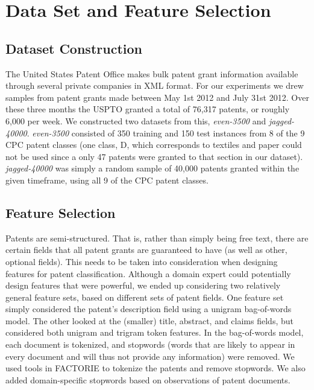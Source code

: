 \section{Data Set and Feature Selection}

\subsection{Dataset Construction}
The United States Patent Office makes bulk patent grant information available through several private companies\cite{USPTO:2013:patent-catalog} in XML format\cite{USPTO:2013:dtd}. For our experiments we drew samples from patent grants made between May 1st 2012 and July 31st 2012. Over these three months the USPTO granted a total of 76,317 patents, or roughly 6,000 per week. We constructed two datasets from this, \emph{even-3500} and \emph{jagged-40000}. \emph{even-3500} consisted of 350 training and 150 test instances from 8 of the 9 CPC patent classes (one class, D, which corresponds to textiles and paper could not be used since a only 47 patents were granted to that section in our dataset). \emph{jagged-40000} was simply a random sample of 40,000 patents granted within the given timeframe, using all 9 of the CPC patent classes.

\subsection{Feature Selection}
Patents are semi-structured. That is, rather than simply being free text, there are certain fields that all patent grants are guaranteed to have (as well as other, optional fields). This needs to be taken into consideration when designing features for patent classification. Although a domain expert could potentially design features that were powerful, we ended up considering two relatively general feature sets, based on different sets of patent fields. One feature set simply considered the patent's description field using a unigram bag-of-words model. The other looked at the (smaller) title, abstract, and claims fields, but considered both unigram and trigram token features. In the bag-of-words model, each document is tokenized, and stopwords (words that are likely to appear in every document and will thus not provide any information) were removed. We used tools in FACTORIE to tokenize the patents and remove stopwords. We also added domain-specific stopwords based on observations of patent documents. 
\indent

